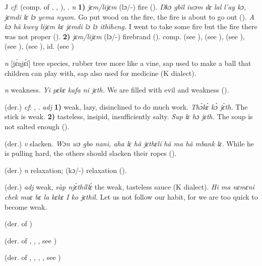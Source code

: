 \begin{letter}{J}
 \textit{cf}:  (comp. of , , ), . \textit{n} \textbf{1)} \textit{jɛm/lijɛm} (lɔ/-) fire (\citealt{Pichl1967}). \textit{Ŋkɔ gbïl iwɔm dɛ lal l'ay kɔ, jɛmdi lɛ lɔ yema nyum.} Go put wood on the fire, the fire is about to go out (\citealt{Pichl1967}). \textit{A kɔ hã kwey lijɛm kɛ jɛmdi lɔ lɔ ithïheng.} I went to take some fire but the fire there was not proper (\citealt{Pichl1967}). \textbf{2)} \textit{jɛm/lijɛm} (lɔ/-) firebrand (\citealt{Pichl1967}). comp.  (see ),  (see ),  (see ),  (see ),  (see ), id.  (see ) 

 \textit{n} [jɛ́ŋjɛ́í] tree species, rubber tree more like a vine, sap used to make a ball that children can play with, sap also used for medicine (K dialect). 

 \textit{n} weakness. \textit{Yi pɛkɛ kafa ni jɛth.} We are filled with evil and weakness (\citealt{Pichl1967}).

 (der.) \textit{cf}: , . \textit{adj} \textbf{1)} weak, lazy, disinclined to do much work. \textit{Thɔ̀kɛ̀ kɔ̀ jɛ̀th.} The stick is weak. \textbf{2)} tasteless, insipid, insufficiently salty. \textit{Sup lɛ hɔ jɛth.} The soup is not salted enough (\citealt{Pichl1967}). 

 (der.) \textit{v} slacken. \textit{Wɔn wɔ gbo nani, aha lɛ hã jɛthɛli hã ma hã mbank lɛ.} While he is pulling hard, the others should slacken their ropes (\citealt{Pichl1967}). 

 (der.) \textit{n} relaxation; (kɔ/-) relaxation (\citealt{Pichl1967}). 

 (der.) \textit{adj} weak, \textit{sùp njɛ̀thíllɛ̀} the weak, tasteless sauce (K dialect). \textit{Hi ma nɛmɛni chek maɛ bɛ la kɛkɛ I ko jɛthil.} Let us not follow our habit, for we are too quick to become weak.

 (der. of ) 

 (der. of , , , see ) 

 (der. of , , , , see ) 


\end{letter}
